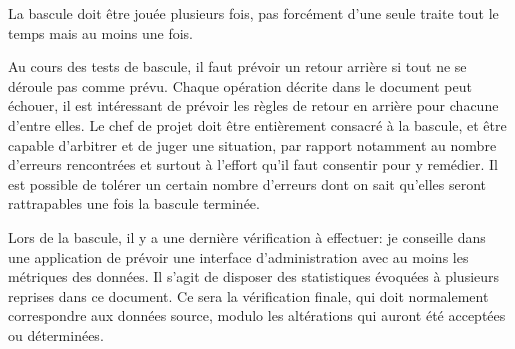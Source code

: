 \documentclass{book}
\begin{document}
La bascule doit être jouée plusieurs fois, pas forcément d'une seule traite tout le temps mais au moins une fois.

Au cours des tests de bascule, il faut prévoir un retour arrière si tout ne se déroule pas comme prévu. Chaque opération décrite dans le document peut échouer, il est intéressant de prévoir les règles de retour en arrière pour chacune d'entre elles. Le chef de projet doit être entièrement consacré à la bascule, et être capable d'arbitrer et de juger une situation, par rapport notamment au nombre d'erreurs rencontrées et surtout à l'effort qu'il faut consentir pour y remédier. Il est possible de tolérer un certain nombre d'erreurs dont on sait qu'elles seront rattrapables une fois la bascule terminée.

Lors de la bascule, il y a une dernière vérification à effectuer: je conseille dans une application de prévoir une interface d'administration avec au moins les métriques des données. Il s'agit de disposer des statistiques évoquées à plusieurs reprises dans ce document. Ce sera la vérification finale, qui doit normalement correspondre aux données source, modulo les altérations qui auront été acceptées ou déterminées.
\end{document}
